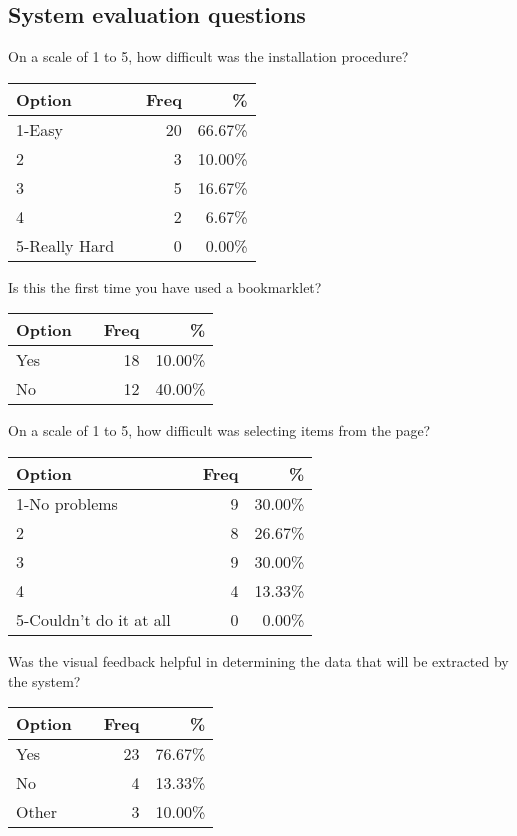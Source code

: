 \subsection{System evaluation questions}
\begin{center}
\singlespacing
\small
On a scale of 1 to 5, how difficult was the installation procedure?\\
\begin{tabular}{|l|c|r|r|}
\hline
Option	& & Freq & \% \\
\hline
\hline
1-Easy	&	&20	&66.67\%\\
2	&	&3	&10.00\%\\
3	&	&5	&16.67\%\\
4	&	&2	&6.67\%\\
5-Really Hard	&	&0	&0.00\%\\
\hline
\end{tabular}

Is this the first time you have used a bookmarklet?\\
\begin{tabular}{|l|c|r|r|}
\hline
Option	& & Freq & \% \\
\hline
\hline
Yes	&	&18	&10.00\%\\
No	&	&12	&40.00\%\\
\hline
\end{tabular}


On a scale of 1 to 5, how difficult was selecting items from the page?\\
\begin{tabular}{|l|c|r|r|}
\hline
Option	& & Freq & \% \\
\hline
\hline
1-No problems	&	&9	&30.00\%\\
2	&	&8	&26.67\%\\
3	&	&9	&30.00\%\\
4	&	&4	&13.33\%\\
5-Couldn't do it at all	&	&0	&0.00\%\\
\hline
\end{tabular}


Was the visual feedback helpful in determining the data that will be extracted by the system?\\
\begin{tabular}{|l|c|r|r|}
\hline
Option	& & Freq & \% \\
\hline
\hline
Yes	&	&23	&76.67\%\\
No	&	&4	&13.33\%\\
Other	&	&3	&10.00\%\\
\hline
\end{tabular}



\end{center}
